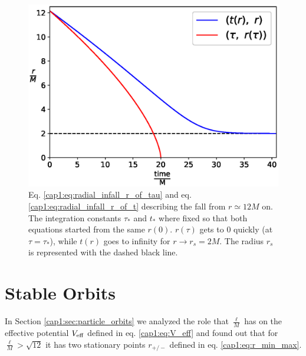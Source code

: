 \begin{figure}[h]
    \centering
    \includegraphics[width = 0.8 \textwidth]{Figures/chapter1/radial_infall.eps}
    \caption{Eq. \ref{cap1:eq:radial_infall_r_of_tau} and eq.
    \ref{cap1:eq:radial_infall_r_of_t} describing the fall from
    $r \simeq 12M$ on.
    The integration constants $\tau_*$ and $t_*$ where fixed so that both
    equations started from the same $r(0)$.
    $r(\tau)$ gets to 0 quickly (at $\tau = \tau_*$), while $t(r)$ goes to
    infinity for $r \rightarrow r_s = 2M$. The \Sh radius $r_s$ is represented
    with the dashed black line.}
    \label{cap1:fig:radial_infall}

\end{figure}

\newpage


\section{Stable Orbits}
\label{cap1:sec:stable_orbits}

In Section \ref{cap1:sec:particle_orbits} we analyzed the role that
$\frac{\ell}{M}$ has on the effective potential $V_{\rm eff}$ defined in eq.
\ref{cap1:eq:V_eff} and found out that for $\frac{\ell}{M} > \sqrt{12}$ it has
two stationary points $r_{+ / -}$ defined in eq. \ref{cap1:eq:r_min_max}.

